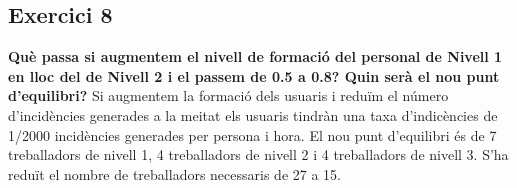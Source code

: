 \documentclass[8pt]{beamer}
\begin{document}
\begin{frame}
\subsection{Exercici 8}
\textbf{Què passa si augmentem el nivell de formació del personal de Nivell 1 en lloc del de Nivell
2 i el passem de 0.5 a 0.8? Quin serà el nou punt d’equilibri?}
\newline
\newline
Si augmentem la formació dels usuaris i reduïm el número d'incidències generades a la meitat els usuaris tindràn una taxa d'indicències de 1/2000 incidències generades per persona i hora.
\newline El nou punt d'equilibri és de 7 treballadors de nivell 1, 4 treballadors de nivell 2 i 4 treballadors de nivell 3.
S'ha reduït el nombre de treballadors necessaris de 27 a 15.
\end{frame}
\end{document}
